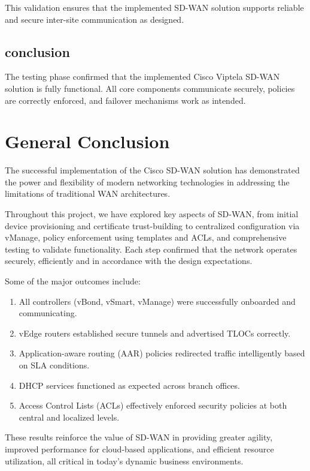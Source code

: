 \documentclass[12pt,english]{report}
\begin{document}
This validation ensures that the implemented SD-WAN solution supports reliable and secure inter-site communication as designed.




\section{conclusion}
The testing phase confirmed that the implemented Cisco Viptela SD-WAN solution is fully functional. All core components communicate securely, policies are correctly enforced, and failover mechanisms work as intended.
\chapter*{General Conclusion}

The successful implementation of the Cisco SD-WAN solution has demonstrated the power and flexibility of modern networking technologies in addressing the limitations of traditional WAN architectures.

Throughout this project, we have explored key aspects of SD-WAN, from initial device provisioning and certificate trust-building to centralized configuration via vManage, policy enforcement using templates and ACLs, and comprehensive testing to validate functionality. Each step confirmed that the network operates securely, efficiently and in accordance with the design expectations.

Some of the major outcomes include:

\begin{enumerate}
    \item All controllers (vBond, vSmart, vManage) were successfully onboarded and communicating.
    \item vEdge routers established secure tunnels and advertised TLOCs correctly.
    \item Application-aware routing (AAR) policies redirected traffic intelligently based on SLA conditions.
    \item DHCP services functioned as expected across branch offices.
    \item Access Control Lists (ACLs) effectively enforced security policies at both central and localized levels.
\end{enumerate}

These results reinforce the value of SD-WAN in providing greater agility, improved performance for cloud-based applications, and efficient resource utilization, all critical in today’s dynamic business environments.
\end{document}
